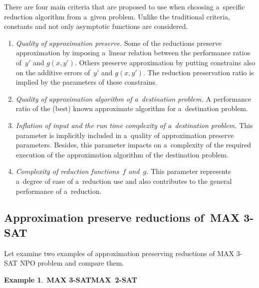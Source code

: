 \begin{multicols}{2}
\noindent
There are four main criteria that are proposed to
use when choosing a~specific reduction algorithm from a~given
problem. Unlike the traditional criteria,  constants and
not only asymptotic
functions are considered.
\begin{enumerate}[1.]
\item {\it Quality of approximation preserve.} Some of
the reductions preserve approximation by imposing a~linear relation
between the performance ratios of~$y'$ and $g(x,y')$. Others
preserve approximation by putting constrains also on the additive
errors of~$y'$ and $g(x,y')$. The reduction preservation ratio is
implied by the parameters of these constrains.
\item {\it Quality of approximation algorithm of a~destination
problem.} A performance ratio of the (best) known approximate
algorithm for a~destination problem.
\item {\it Inflation of input and the run time complexity of
a~destination problem.} This parameter is implicitly included in
a~quality of approximation preserve parameters. Besides, this
parameter impacts on a~complexity of the
required execution of the approximation algorithm of the destination
problem.
\item {\it Complexity of reduction functions~$f$ and~$g$.} This
parameter represents a~degree of ease of a~reduction use and also
contributes to the general performance of a~reduction.
\end{enumerate}

\subsection{Approximation preserve reductions of~MAX 3-SAT}

\noindent
Let examine two examples of approximation preserving reductions of
{MAX 3-SAT} NPO problem and compare them.

\smallskip

\noindent
\textbf{Example 1}.\
\textbf{MAX 3-SAT\;MAX~2-SAT}


\smallskip


\end{multicols}
